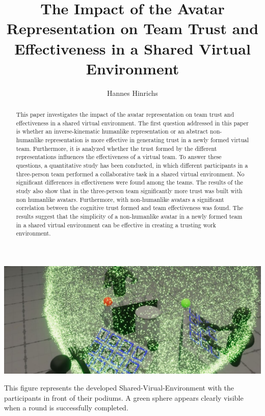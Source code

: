 \documentclass[sigchi]{acmart}
\begin{document}
\title{The Impact of the Avatar Representation on Team Trust and Effectiveness in a Shared Virtual Environment}

\author{Hannes Hinrichs}

\begin{abstract}
This paper investigates the impact of the avatar representation on team trust and effectiveness in a shared virtual environment. The first question addressed in this paper is whether an inverse-kinematic humanlike representation or an abstract non-humanlike representation is more effective in generating trust in a newly formed virtual team. Furthermore, it is analyzed whether the trust formed by the different representations influences the effectiveness of a virtual team. To answer these questions, a quantitative study has been conducted, in which different participants in a three-person team performed a collaborative task in a shared virtual environment. No significant differences in effectiveness were found among the teams. The results of the study also show that in the three-person team significantly more trust was built with non humanlike avatars. Furthermore, with non-humanlike avatars a significant correlation between the cognitive trust formed and team effectiveness was found. The results suggest that the simplicity of a non-humanlike avatar in a newly formed team in a shared virtual environment can be effective in creating a trusting work environment.
\end{abstract}


\begin{teaserfigure}
  \includegraphics[width=\textwidth]{Abbildungen/RoundSuccsessful2}
  \caption{This figure represents the developed Shared-Virual-Environment with the participants in front of their podiums. A green sphere appears clearly visible when a round is successfully completed.}
  \label{fig:teaser}
\end{teaserfigure}
\end{document}
